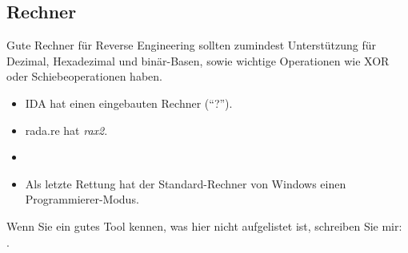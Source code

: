 \subsection{Rechner}

Gute Rechner für Reverse Engineering sollten zumindest Unterstützung für Dezimal, Hexadezimal und binär-Basen,
sowie wichtige Operationen wie XOR oder Schiebeoperationen haben.

\begin{itemize}

\item IDA hat einen eingebauten Rechner (``?'').

\item rada.re hat \emph{rax2}.

\item \ProgCalcURL

\item Als letzte Rettung hat der Standard-Rechner von Windows einen Programmierer-Modus.

\end{itemize}


Wenn Sie ein gutes Tool kennen, was hier nicht aufgelistet ist, schreiben Sie mir:\\
\TT{\EMAILS}.
